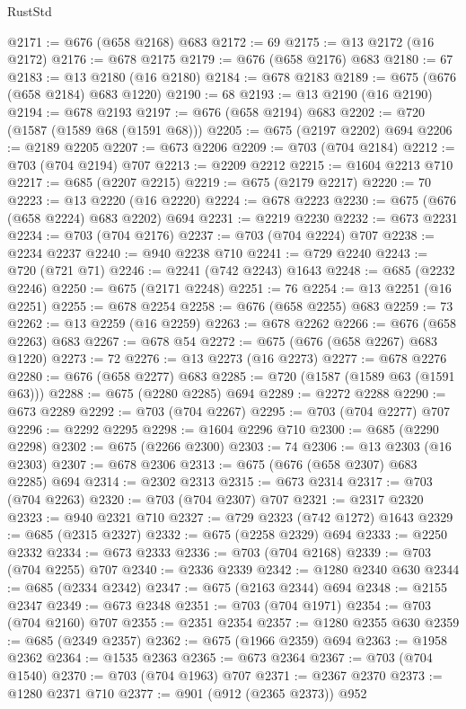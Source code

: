 \begin{lexlean}{RustStd}
\begin{coremodule}
@2171 := @676 (@658 @2168) @683
@2172 := 69
@2175 := @13 @2172 (@16 @2172)
@2176 := @678 @2175
@2179 := @676 (@658 @2176) @683
@2180 := 67
@2183 := @13 @2180 (@16 @2180)
@2184 := @678 @2183
@2189 := @675 (@676 (@658 @2184) @683 @1220)
@2190 := 68
@2193 := @13 @2190 (@16 @2190)
@2194 := @678 @2193
@2197 := @676 (@658 @2194) @683
@2202 := @720 (@1587 (@1589 @68 (@1591 @68)))
@2205 := @675 (@2197 @2202) @694
@2206 := @2189 @2205
@2207 := @673 @2206
@2209 := @703 (@704 @2184)
@2212 := @703 (@704 @2194) @707
@2213 := @2209 @2212
@2215 := @1604 @2213 @710
@2217 := @685 (@2207 @2215)
@2219 := @675 (@2179 @2217)
@2220 := 70
@2223 := @13 @2220 (@16 @2220)
@2224 := @678 @2223
@2230 := @675 (@676 (@658 @2224) @683 @2202) @694
@2231 := @2219 @2230
@2232 := @673 @2231
@2234 := @703 (@704 @2176)
@2237 := @703 (@704 @2224) @707
@2238 := @2234 @2237
@2240 := @940 @2238 @710
@2241 := @729 @2240
@2243 := @720 (@721 @71)
@2246 := @2241 (@742 @2243) @1643
@2248 := @685 (@2232 @2246)
@2250 := @675 (@2171 @2248)
@2251 := 76
@2254 := @13 @2251 (@16 @2251)
@2255 := @678 @2254
@2258 := @676 (@658 @2255) @683
@2259 := 73
@2262 := @13 @2259 (@16 @2259)
@2263 := @678 @2262
@2266 := @676 (@658 @2263) @683
@2267 := @678 @54
@2272 := @675 (@676 (@658 @2267) @683 @1220)
@2273 := 72
@2276 := @13 @2273 (@16 @2273)
@2277 := @678 @2276
@2280 := @676 (@658 @2277) @683
@2285 := @720 (@1587 (@1589 @63 (@1591 @63)))
@2288 := @675 (@2280 @2285) @694
@2289 := @2272 @2288
@2290 := @673 @2289
@2292 := @703 (@704 @2267)
@2295 := @703 (@704 @2277) @707
@2296 := @2292 @2295
@2298 := @1604 @2296 @710
@2300 := @685 (@2290 @2298)
@2302 := @675 (@2266 @2300)
@2303 := 74
@2306 := @13 @2303 (@16 @2303)
@2307 := @678 @2306
@2313 := @675 (@676 (@658 @2307) @683 @2285) @694
@2314 := @2302 @2313
@2315 := @673 @2314
@2317 := @703 (@704 @2263)
@2320 := @703 (@704 @2307) @707
@2321 := @2317 @2320
@2323 := @940 @2321 @710
@2327 := @729 @2323 (@742 @1272) @1643
@2329 := @685 (@2315 @2327)
@2332 := @675 (@2258 @2329) @694
@2333 := @2250 @2332
@2334 := @673 @2333
@2336 := @703 (@704 @2168)
@2339 := @703 (@704 @2255) @707
@2340 := @2336 @2339
@2342 := @1280 @2340 @630
@2344 := @685 (@2334 @2342)
@2347 := @675 (@2163 @2344) @694
@2348 := @2155 @2347
@2349 := @673 @2348
@2351 := @703 (@704 @1971)
@2354 := @703 (@704 @2160) @707
@2355 := @2351 @2354
@2357 := @1280 @2355 @630
@2359 := @685 (@2349 @2357)
@2362 := @675 (@1966 @2359) @694
@2363 := @1958 @2362
@2364 := @1535 @2363
@2365 := @673 @2364
@2367 := @703 (@704 @1540)
@2370 := @703 (@704 @1963) @707
@2371 := @2367 @2370
@2373 := @1280 @2371 @710
@2377 := @901 (@912 (@2365 @2373)) @952

\end{coremodule}
\end{lexlean}

